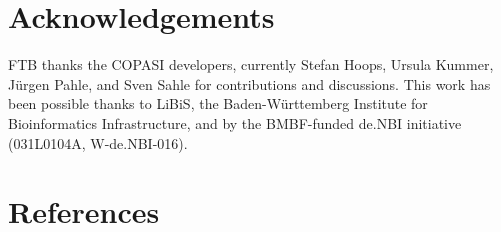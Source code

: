 \documentclass[10pt,a4paper,onecolumn]{article}
\begin{document}
  \section{Acknowledgements}\label{acknowledgements}

  FTB thanks the COPASI developers, currently Stefan Hoops, Ursula Kummer,
  Jürgen Pahle, and Sven Sahle for contributions and discussions. This
  work has been possible thanks to LiBiS, the Baden-Württemberg Institute
  for Bioinformatics Infrastructure, and by the BMBF-funded de.NBI
  initiative (031L0104A, W-de.NBI-016).

  \section*{References}\label{references}
\end{document}
